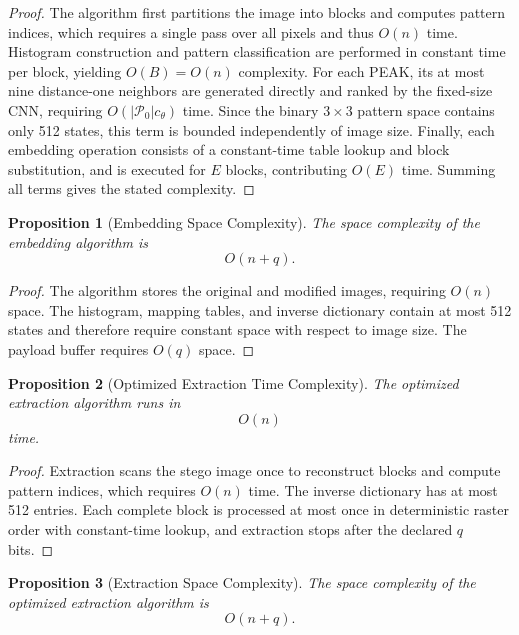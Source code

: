 \documentclass[a4paper,fleqn]{cas-dc}
\newtheorem{proposition}{Proposition}[section]
\begin{document}
\begin{proof}
The algorithm first partitions the image into blocks and computes pattern
indices, which requires a single pass over all pixels and thus $O(n)$ time.
Histogram construction and pattern classification are performed in constant
time per block, yielding $O(B)=O(n)$ complexity.
For each PEAK, its at most nine distance-one neighbors are generated directly
and ranked by the fixed-size CNN, requiring
$O(|\mathcal P_0|c_\theta)$ time. Since the binary $3\times3$ pattern space
contains only 512 states, this term is bounded independently of image size.
Finally, each embedding operation consists of a constant-time table lookup and
block substitution, and is executed for $E$ blocks, contributing $O(E)$ time.
Summing all terms gives the stated complexity.
\end{proof}

\begin{proposition}[Embedding Space Complexity]
The space complexity of the embedding algorithm is
\begin{equation}
O(n+q).
\label{eq:embedding-space}
\end{equation}
\end{proposition}

\begin{proof}
The algorithm stores the original and modified images, requiring $O(n)$ space.
The histogram, mapping tables, and inverse dictionary contain at most 512
states and therefore require constant space with respect to image size. The
payload buffer requires $O(q)$ space.
\end{proof}

\begin{proposition}[Optimized Extraction Time Complexity]
The optimized extraction algorithm runs in
\begin{equation}
O(n)
\label{eq:extraction-time}
\end{equation}
time.
\end{proposition}

\begin{proof}
Extraction scans the stego image once to reconstruct blocks and compute pattern
indices, which requires $O(n)$ time.
The inverse dictionary has at most 512 entries. Each complete block is
processed at most once in deterministic raster order with constant-time
lookup, and extraction stops after the declared $q$ bits.
\end{proof}

\begin{proposition}[Extraction Space Complexity]
The space complexity of the optimized extraction algorithm is
\begin{equation}
O(n+q).
\label{eq:extraction-space}
\end{equation}
\end{proposition}
\end{document}
